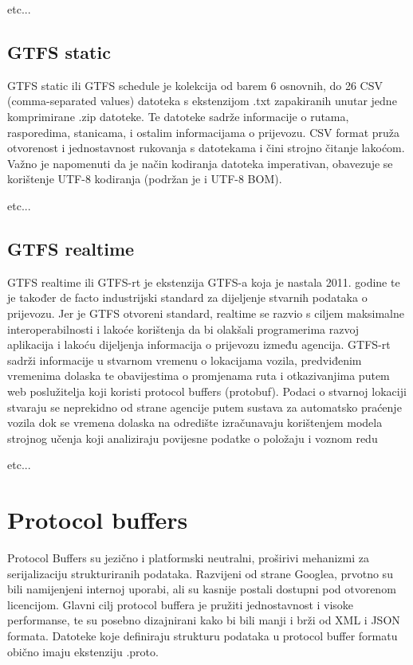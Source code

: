 \documentclass[zavrsnirad]{fer}
\begin{document}
etc...

\subsection{GTFS static}

GTFS static ili GTFS schedule je kolekcija od barem 6 osnovnih, do 26 CSV (comma-separated
values) datoteka s ekstenzijom .txt zapakiranih unutar jedne komprimirane .zip datoteke. Te datoteke
sadrže informacije o rutama, rasporedima, stanicama, i ostalim informacijama o prijevozu. CSV
format pruža otvorenost i jednostavnost rukovanja s datotekama i čini strojno čitanje lakoćom.
Važno je napomenuti da je način kodiranja datoteka imperativan, obavezuje se korištenje UTF-8
kodiranja (podržan je i UTF-8 BOM).

etc...

\subsection{GTFS realtime}

GTFS realtime ili GTFS-rt je ekstenzija GTFS-a koja je nastala 2011. godine te je također de facto
industrijski standard za dijeljenje stvarnih podataka o prijevozu. Jer je GTFS otvoreni standard,
realtime se razvio s ciljem maksimalne interoperabilnosti i lakoće korištenja da bi olakšali
programerima razvoj aplikacija i lakoću dijeljenja informacija o prijevozu između agencija. GTFS-rt
sadrži informacije u stvarnom vremenu o lokacijama vozila, predviđenim vremenima dolaska te
obavijestima o promjenama ruta i otkazivanjima putem web poslužitelja koji koristi protocol buffers
(protobuf). Podaci o stvarnoj lokaciji stvaraju se neprekidno od strane agencije putem sustava za
automatsko praćenje vozila dok se vremena dolaska na odredište izračunavaju korištenjem modela
strojnog učenja koji analiziraju povijesne podatke o položaju i voznom redu

etc...

\section[Protobuf]{Protocol buffers}

Protocol Buffers su jezično i platformski neutralni, proširivi mehanizmi za serijalizaciju
strukturiranih podataka. Razvijeni od strane Googlea, prvotno su bili namijenjeni internoj uporabi,
ali su kasnije postali dostupni pod otvorenom licencijom. Glavni cilj protocol buffera je pružiti
jednostavnost i visoke performanse, te su posebno dizajnirani kako bi bili manji i brži od XML i
JSON formata. Datoteke koje definiraju strukturu podataka u protocol buffer formatu obično imaju
ekstenziju .proto.
\end{document}
